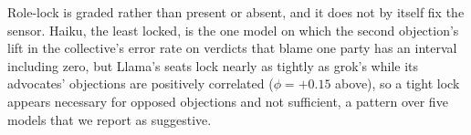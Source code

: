 Role-lock is graded rather than present or absent, and it does not by itself
fix the sensor. Haiku, the least locked, is the one model on which the second
objection's lift in the collective's error rate on verdicts that blame one
party has an interval including zero, but Llama's seats lock nearly as
tightly as grok's while its advocates' objections are positively correlated
($\phi = +0.15$ above), so a tight lock appears necessary for opposed
objections and not sufficient, a pattern over five models that we report as
suggestive.

